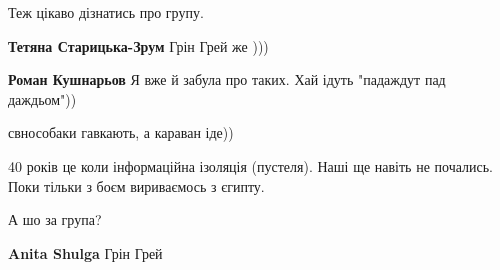 \begin{itemize}
Теж цікаво дізнатись про групу.

\begin{itemize}
 
\textbf{Тетяна Старицька-Зрум} Грін Грей же )))

 
\textbf{Роман Кушнарьов} Я вже й забула про таких. Хай ідуть "падаждут пад даждьом"))
\end{itemize}

 
свнособаки гавкають, а караван іде))

 
40 років це коли інформаційна ізоляція (пустеля). Наші ще навіть не почались. Поки тільки з боєм вириваємось з єгипту.

 
А шо за група?

\begin{itemize}
 
\textbf{Anita Shulga} Грін Грей
\end{itemize}


\end{itemize}
